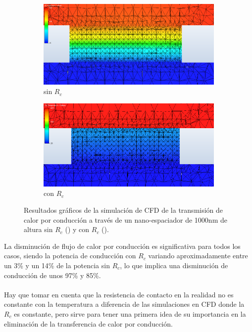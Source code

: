 \begin{figure}[H]
	\centering 		%
	\begin{subfigure}[b]{0.49\textwidth}
	\centering
		\includegraphics[width=1.00\textwidth]{SiSiO2Si_1000nm_Plane2.png}
		\caption{sin $R_c$}
	\label{fig:Pcond_SiSiO2Si_CFD}
\end{subfigure}
\hfill 					%
\begin{subfigure}[b]{0.49\textwidth}
	\centering
		\includegraphics[width=1.00\textwidth]{SiSiO2Si_1000nm_Plane_Rc.png}
		\caption{con $R_c$}
	\label{fig:Pcond_SiSiO2Si_Rc_CFD}
\end{subfigure}
\caption{Resultados gráficos de la simulación de CFD de la transmisión de calor por conducción a través de un nano-espaciador de 1000nm de altura sin $R_c$ () y con $R_c$ ().}
	\label{fig:Pconds_SiSiO2Si_CFD}
\end{figure}
La disminución de flujo de calor por conducción es significativa para todos los casos, siendo la potencia de conducción con $R_c$ variando aproximadamente entre un 3\% y un 14\% de la potencia sin $R_c$, lo que implica una disminución de conducción de unos 97\% y 85\%.\\\\
Hay que tomar en cuenta que la resistencia de contacto en la realidad no es constante con la temperatura a diferencia de las simulaciones en CFD donde la $R_c$ es constante, pero sirve para tener una primera idea de su importancia en la eliminación de la transferencia de calor por conducción.
